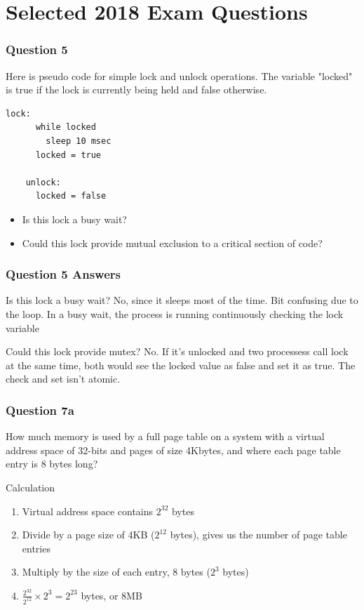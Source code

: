 \documentclass{beamer}
\begin{document}
\section{Selected 2018 Exam Questions}
\begin{frame}[fragile]
  \frametitle{Question 5}
  Here is pseudo code for simple lock and unlock operations. The variable "locked" is true if the lock is currently being held and false otherwise.
  \begin{lstlisting}[style=customc]
    lock:
      while locked
        sleep 10 msec
      locked = true

    unlock:
      locked = false
  \end{lstlisting}
  \begin{itemize}
    \item Is this lock a busy wait?
    \item Could this lock provide mutual exclusion to a critical section of code?
  \end{itemize}
\end{frame}
\begin{frame}
  \frametitle{Question 5 Answers}
  \begin{block}{Is this lock a busy wait?}
    No, since it sleeps most of the time. Bit confusing due to the loop. In a busy wait, the process is running continuously checking the lock variable
  \end{block}
  \begin{block}{Could this lock provide mutex?}
    No. If it's unlocked and two processess call lock at the same time, both would see the locked value as false and set it as true. The check and set isn't atomic.
  \end{block}
\end{frame}
\begin{frame}
  \frametitle{Question 7a}
  How much memory is used by a full page table on a system with a virtual address space of 32-bits and pages of size 4Kbytes, and where each page table entry is 8 bytes long?
  \pause
  \begin{block}{Calculation}
    \begin{enumerate}
      \item Virtual address space contains $2^{32}$ bytes
      \pause
      \item Divide by a page size of 4KB ($2^{12}$ bytes), gives us the number of page table entries
      \pause
      \item Multiply by the size of each entry, 8 bytes ($2^3$ bytes)
      \pause
      \item $\frac{2^{32}}{2^{12}}\times 2^3 = 2^{23}$ bytes, or 8MB
    \end{enumerate}
  \end{block}
\end{frame}
\end{document}
